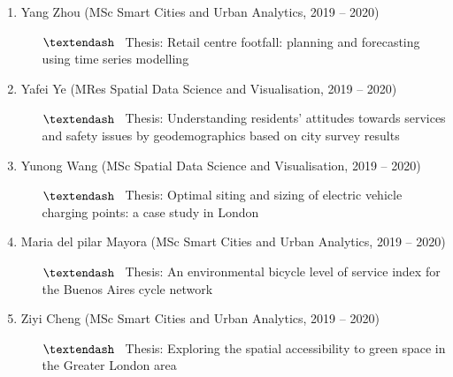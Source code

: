\documentclass[A4,11pt]{article}
\newcommand{\MScStduentItem}[4]{
  \item #1 (#2, #3)
   \begin{itemize}
    \item[$\textendash$] \ #4
   \end{itemize}
}
\begin{document}
\begin{enumerate}
\begin{enumerate}
\begin{enumerate}
           {Thesis: Can we predict why people travel within a city? A cast study in Montreal, Canada}
          \MScStduentItem{Yang Zhou}{MSc Smart Cities and Urban Analytics}{2019 -- 2020}
           {Thesis: Retail centre footfall: planning and forecasting using time series modelling}
          \MScStduentItem{Yafei Ye}{MRes Spatial Data Science and Visualisation}{2019 -- 2020}
           {Thesis: Understanding residents’ attitudes towards services and safety issues by geodemographics based on city survey results}
          \MScStduentItem{Yunong Wang}{MSc Spatial Data Science and Visualisation}{2019 -- 2020}
           {Thesis: Optimal siting and sizing of electric vehicle charging points: a case study in London}
          \MScStduentItem{Maria del pilar Mayora}{MSc Smart Cities and Urban Analytics}{2019 -- 2020}
           {Thesis: An environmental bicycle level of service index for the Buenos Aires cycle network}
          \MScStduentItem{Ziyi Cheng}{MSc Smart Cities and Urban Analytics}{2019 -- 2020}
           {Thesis: Exploring the spatial accessibility to green space in the Greater London area}

       \end{enumerate}
     \end{enumerate}
\end{enumerate}  

\begin{comment}
Ideally the title of the work should speak for what it is. However if you feel
like you should explain more about why the project is applicable to this job,
use item list as is shown in the work experience section.
\end{comment}
\end{document}
